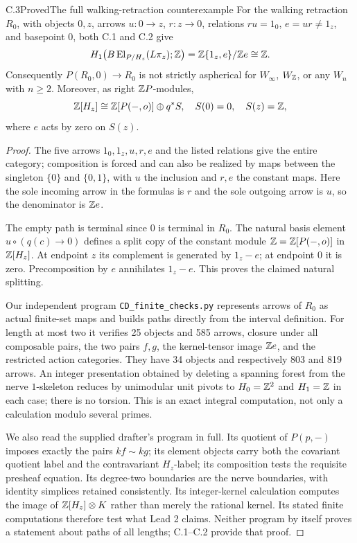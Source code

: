 \begin{claim}{C.3}{Proved}{The full walking-retraction counterexample}
\label{C:retraction}
For the walking retraction $R_0$, with objects $0,z$, arrows
$u:0\to z$, $r:z\to0$, relations $ru=1_0$, $e=ur\ne1_z$,
and basepoint $0$, both C.1 and C.2 give
\[
 H_1\bigl(B\operatorname{El}_{P/H_z}(L\pi_z);\mathbb Z\bigr)
   =\mathbb Z\{1_z,e\}/\mathbb Z e\cong\mathbb Z.
\]
Consequently $P(R_0,0)\to R_0$ is not strictly aspherical for
$W_\infty$, $W_{\mathbb Z}$, or any $W_n$ with $n\geq2$.
Moreover, as right $\mathbb Z P$-modules,
\[
 \mathbb Z[H_z]\cong\mathbb Z[P(-,o)]\oplus q^*S,
 \quad S(0)=0,\quad S(z)=\mathbb Z,
\]
where $e$ acts by zero on $S(z)$.
\end{claim}
\begin{proof}
The five arrows $1_0,1_z,u,r,e$ and the listed relations give the
entire category; composition is forced and can also be realized by
maps between the singleton $\{0\}$ and $\{0,1\}$, with $u$ the
inclusion and $r,e$ the constant maps. Here the sole incoming arrow
in the formulas is $r$ and the sole outgoing arrow is $u$, so the
denominator is $\mathbb Z e$.

The empty path is terminal since $0$ is terminal in $R_0$.
The natural basis element $u\circ(q(c)\to0)$ defines a split
copy of the constant module $\mathbb Z=\mathbb Z[P(-,o)]$ in $\mathbb Z[H_z]$.
At endpoint $z$ its complement is generated by $1_z-e$; at endpoint
$0$ it is zero. Precomposition by $e$ annihilates $1_z-e$.
This proves the claimed natural splitting.

Our independent program \texttt{CD\_finite\_checks.py} represents
arrows of $R_0$ as actual finite-set maps and builds paths directly
from the interval definition. For length at most two it verifies
25 objects and 585 arrows, closure under all composable pairs,
the two pairs $f,g$, the kernel-tensor image $\mathbb Z e$, and the
restricted action categories. They have 34 objects and respectively
803 and 819 arrows. An integer presentation obtained by deleting a
spanning forest from the nerve $1$-skeleton reduces by unimodular
unit pivots to $H_0=\mathbb Z^2$ and $H_1=\mathbb Z$ in each case; there is
no torsion. This is an exact integral computation, not only a
calculation modulo several primes.

We also read the supplied drafter's program in full. Its quotient
of $P(p,-)$ imposes exactly the pairs $kf\sim kg$; its element
objects carry both the covariant quotient label and the contravariant
$H_z$-label; its composition tests the requisite presheaf equation.
Its degree-two boundaries are the nerve boundaries, with identity
simplices retained consistently. Its integer-kernel calculation
computes the image of $\mathbb Z[H_z]\otimes K$ rather than merely the
rational kernel. Its stated finite computations therefore test
what Lead 2 claims. Neither program by itself proves a statement
about paths of all lengths; C.1--C.2 provide that proof.
\end{proof}

